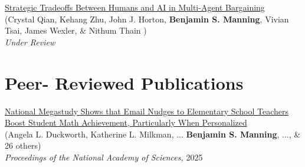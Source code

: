 \documentclass[margin,line,pifont,palatino,courier, 9pt]{res}
\begin{document}
\begin{resume}
\href{https://arxiv.org/abs/2509.09071}{Strategic Tradeoffs Between Humans and AI in Multi-Agent Bargaining}\\
(Crystal Qian\footnotemark[\value{footnote}], Kehang Zhu\footnotemark[\value{footnote}],  John J. Horton, \textbf{Benjamin S. Manning}, Vivian Tsai, James Wexler, \& Nithum Thain )\\
\textit{Under Review}


\section{\sc Peer- Reviewed Publications}
\href{https://www.pnas.org/doi/10.1073/pnas.2418616122}{National Megastudy Shows that Email Nudges to Elementary School Teachers Boost Student Math Achievement, Particularly When Personalized}\\
(Angela L. Duckworth\footnotemark[\value{footnote}], Katherine L. Milkman, ... \textbf{Benjamin S. Manning}, ..., \& 26 others)\\
\textit{Proceedings of the National Academy of Sciences,} 2025


\end{resume}
\end{document}
